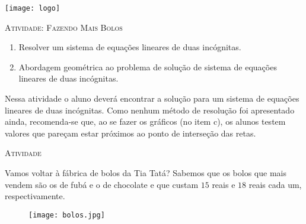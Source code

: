 \documentclass[10 pt,usenames,dvipsnames, oneside]{article}
\begin{document}
\begin{center}
  \begin{minipage}[l]{3cm}
\texttt{[image: logo]}    
\end{minipage}\hfill
\begin{minipage}[r]{.8\textwidth}
 {\Large \scshape Atividade: Fazendo Mais Bolos}  
\end{minipage}
\end{center}
\vspace{.2cm}

\ifdefined\prof

\begin{goals}
\begin{enumerate}
\item Resolver um sistema de equações lineares de duas incógnitas.
\item Abordagem geométrica ao problema de solução de sistema de equações lineares de duas incógnitas. 
\end{enumerate}

\tcblower

Nessa atividade o aluno deverá encontrar a solução para um sistema de equações lineares de duas incógnitas. Como nenhum método de resolução foi apresentado ainda, recomenda-se que, ao se fazer os gráficos (no item c), os alunos testem valores que pareçam estar próximos ao ponto de interseção das retas.
\end{goals}

\bigskip
\begin{center}
{\large \scshape Atividade}
\end{center}
\fi

Vamos voltar à fábrica de bolos da Tia Tatá? Sabemos que os bolos que mais vendem são os de fubá e o de chocolate e que custam $15$ reais e $18$ reais cada um, respectivamente.

\begin{figure}[H]
\centering

\noindent\texttt{[image: bolos.jpg]}
\end{figure}
\end{document}

